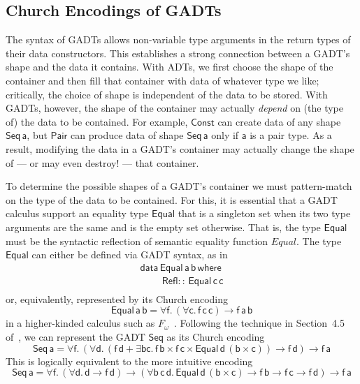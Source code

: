 \documentclass[acmsmall,screen,review,anonymous]{acmart}
\theoremstyle{definition}
\begin{document}
\subsection{Church Encodings of GADTs}\label{sec:CEs}

The syntax of GADTs allows non-variable type arguments in the return
types of their data constructors. This establishes a strong connection
between a GADT's shape and the data it contains. With ADTs, we first
choose the shape of the container and then fill that container with
data of whatever type we like; critically, the choice of shape is
independent of the data to be stored. With GADTs, however, the shape
of the container may actually {\em depend} on (the type of) the data
to be contained. For example, $\mathsf{Const}$ can create data of any
shape $\mathsf{Seq\,a}$, but $\mathsf{Pair}$ can produce data of shape
$\mathsf{Seq\,a}$ only if $\mathsf{a}$ is a pair type. As a result,
modifying the data in a GADT's container may actually change the shape
of --- or may even destroy! --- that container.

To determine the possible shapes of a GADT's container we must
pattern-match on the type of the data to be contained. For this, it is
essential that a GADT calculus support an equality type
$\mathsf{Equal}$ that is a singleton set when its two type arguments
are the same and is the empty set otherwise. That is, the type
$\mathsf{Equal}$ must be the syntactic reflection of semantic equality
function $\mathit{Equal}$. The type $\mathsf{Equal}$ can either be
defined via GADT syntax, as in
\[\begin{array}{l}
\mathsf{data\, Equal\,a\,b\,where}\\
\mathsf{\;\;\;\;\;\;\;\;Refl ::\, Equal\,c\,c}\\
\end{array}\]
\noindent
or, equivalently, represented by its Church encoding
\[\mathsf{Equal\,a\,b} = \mathsf{\forall f.\, (\forall c.\,
  f\,c\,c) \to f\,a\,b}\] in a higher-kinded calculus such as
$F_\omega$~\cite{atk12}. Following the technique in Section~4.5
of~\cite{atk12}, we can represent the GADT $\mathsf{Seq}$ as its
Church encoding
\[\mathsf{Seq\,a} = \mathsf{\forall f.\,(\forall d. \,(f\,d + \exists b
  c.\, f\, b \times f \,c \times \mathsf{Equal}\, d \,(b \times c))
  \to f \,d) \to f\, a}\]
This is logically equivalent to the more intuitive encoding
\[\mathsf{Seq\,a} = \mathsf{\forall f.\, (\forall d.\,d \to f\, d)
  \to (\forall b\,c\,d.\,Equal\,d\,(b\times c) \to f\,b \to f\,c \to
  f\,d) \to f\,a}\]
\end{document}
